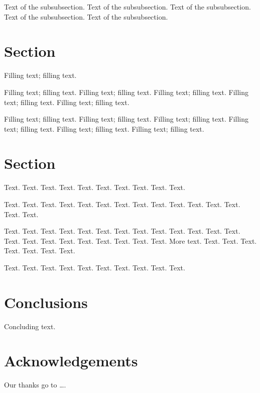 \documentclass[11pt]{article}
\begin{document}
Text of the subsubsection.
Text of the subsubsection.
Text of the subsubsection.
Text of the subsubsection.
Text of the subsubsection.


\section{Section}

Filling text; filling text.

Filling text; filling text.
Filling text; filling text.
Filling text; filling text.
Filling text; filling text.
Filling text; filling text.

Filling text; filling text.
Filling text; filling text.
Filling text; filling text.
Filling text; filling text.
Filling text; filling text.
Filling text; filling text.

\section{Section}

Text. Text. Text. Text. Text.
Text. Text. Text. Text. Text.

Text. Text. Text. Text. Text.
Text. Text. Text. Text. Text.
Text. Text. Text. Text. Text.

Text. Text. Text. Text. Text.
Text. Text. Text. Text. Text.
Text. Text. Text. Text. Text.
Text. Text. Text. Text. Text.
Text. Text. More text. Text. Text.
Text. Text. Text. Text. Text.

Text. Text. Text. Text. Text.
Text. Text. Text. Text. Text.

\section{Conclusions}

Concluding text.

\section{Acknowledgements}

Our thanks go to \ldots .



\end{document}
